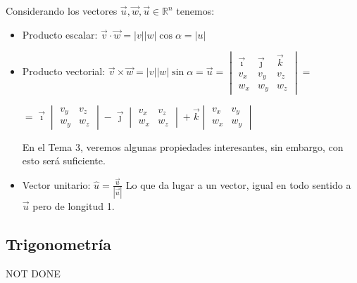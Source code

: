 \vspace{0.5cm}
Considerando los vectores \( \vec{u},\vec{w}, \vec{u} \in \mathbb{R}^n\) tenemos:


\vspace{0.3cm}
\begin{itemize}
        \item Producto escalar: \( \vec{v}\cdot \vec{w} = \left\lvert v\right\rvert \left\lvert w\right\rvert \cos{\alpha } = \left\lvert u\right\rvert \)


        \item Producto vectorial: \(\vec{v}\times  \vec{w} = \left\lvert v\right\rvert \left\lvert w\right\rvert \sin{\alpha } = \vec{u} = \begin{vmatrix}
                      \vec{\imath} & \vec{\jmath} & \vec{k} \\
                      v_x          & v_y          & v_z     \\
                      w_x          & w_y          & w_z
              \end{vmatrix} =\) \par \hspace{1.5cm} \( = \vec{\imath}
              \begin{vmatrix}
                      v_y & v_z \\
                      w_y & w_z
              \end{vmatrix}
              -\vec{\jmath} \begin{vmatrix}
                      v_x & v_z \\
                      w_x & w_z
              \end{vmatrix}
              + \vec{k} \begin{vmatrix}
                      v_x & v_y \\
                      w_x & w_y
              \end{vmatrix}
              \) \par
              En el Tema 3, veremos algunas propiedades interesantes, sin embargo, con esto será suficiente.
        \item Vector unitario: \( \hat{u} = \frac{\vec{u}}{\left | \vec{u} \right |}\) Lo que da lugar a un vector, igual en todo sentido a \(\vec{u}\) pero de longitud 1.
\end{itemize}
\subsection{Trigonometría}
NOT DONE